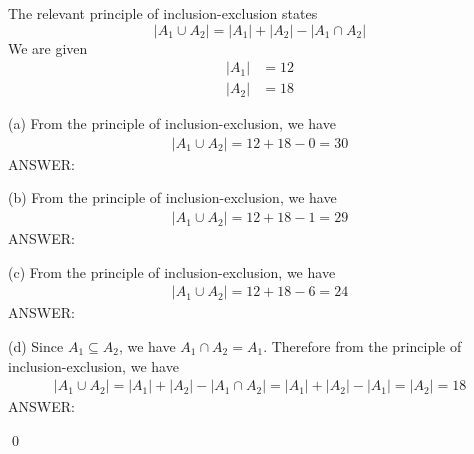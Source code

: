 The relevant principle of inclusion-exclusion states
\[
|A_1 \cup A_2| = |A_1| + |A_2| - |A_1 \cap A_2| 
\]
We are given
\begin{align*}
|A_1| &= 12 \\
|A_2| &= 18 
\end{align*}

(a)
From the principle of inclusion-exclusion, we have
\begin{align*}
|A_1 \cup A_2| = 12 + 18 - 0 = 30
\end{align*}
ANSWER:


(b)
From the principle of inclusion-exclusion, we have
\begin{align*}
|A_1 \cup A_2| = 12 + 18 - 1 = 29
\end{align*}
ANSWER:

(c)
From the principle of inclusion-exclusion, we have
\begin{align*}
|A_1 \cup A_2| = 12 + 18 - 6 = 24
\end{align*}
ANSWER:

(d) Since $A_1\subseteq A_2$, we have $A_1 \cap A_2 = A_1$.
Therefore
from the principle of inclusion-exclusion, we have
\begin{align*}
|A_1 \cup A_2| = |A_1| + |A_2| - |A_1 \cap A_2| = |A_1| + |A_2| - |A_1| = 
|A_2| = 18
\end{align*}
ANSWER:

\qed
